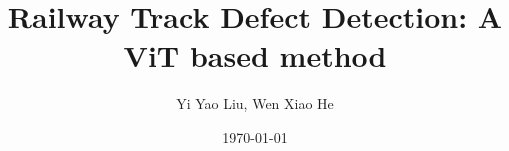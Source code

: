 \documentclass[journal]{IEEEtran}
\begin{document}
 
    \title{Railway Track Defect Detection: A ViT based method}
    \author{Yi Yao Liu, Wen Xiao He}
    \date{\today}
    \maketitle
    
    \printbibliography
\end{document}
